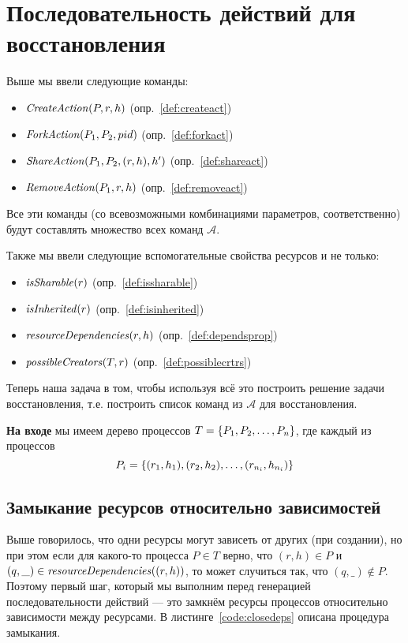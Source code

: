 \section{Последовательность действий для восстановления}

Выше мы ввели следующие команды:

\begin{itemize}
	\item $\text{\textit{CreateAction}}(P, r, h)$ (опр.~\ref{def:createact})
	\item $\text{\textit{ForkAction}}(P_1, P_2, pid)$ (опр.~\ref{def:forkact})
	\item $\text{\textit{ShareAction}}(P_1, P_2, (r, h), h')$ (опр.~\ref{def:shareact})
	\item $\text{\textit{RemoveAction}}(P_1, r, h)$ (опр.~\ref{def:removeact})
\end{itemize}

Все эти команды (со всевозможными комбинациями параметров, соответственно) будут составлять множество всех команд $\mathcal{A}$.

Также мы ввели следующие вспомогательные свойства ресурсов и не только:

\begin{itemize}
	\item $\text{\textit{isSharable}}(r)$ (опр.~\ref{def:issharable})
	\item $\text{\textit{isInherited}}(r)$ (опр.~\ref{def:isinherited})
	\item $\text{\textit{resourceDependencies}}(r, h)$ (опр.~\ref{def:dependsprop})
	\item $\text{\textit{possibleCreators}}(T, r)$ (опр.~\ref{def:possiblecrtrs})
\end{itemize}

Теперь наша задача в том, чтобы используя всё это построить решение задачи восстановления, т.е. построить список команд из $\mathcal{A}$ для восстановления.

\textbf{На входе} мы имеем дерево процессов $T = \left\lbrace P_1, P_2, \ldots, P_n \right\rbrace$, где каждый из процессов 
\begin{equation*}
P_i = \left\lbrace (r_1, h_1), (r_2, h_2), \ldots, (r_{n_i}, h_{n_i}) \right\rbrace
\end{equation*}


\subsection{Замыкание ресурсов относительно зависимостей}

Выше говорилось, что одни ресурсы могут зависеть от других (при создании), но при этом если для какого-то процесса $P \in T$ верно, что $(r, h) \in P$ и $(q, \_) \in \text{\textit{resourceDependencies}}((r, h))$, то может случиться так, что $(q, \_) \notin P$. Поэтому первый шаг, который мы выполним перед генерацией последовательности действий --- это замкнём ресурсы процессов относительно зависимости между ресурсами. В листинге~\ref{code:closedeps} описана процедура замыкания. 

